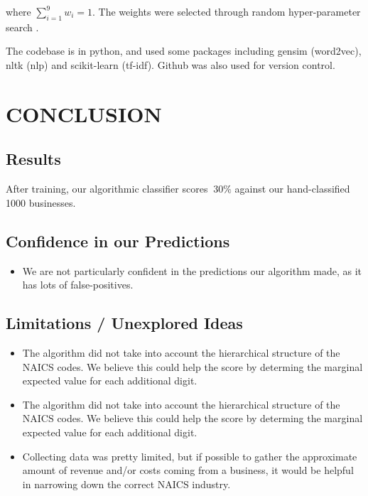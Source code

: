 \documentclass[letterpaper, 9 pt, conference]{IEEEtran}
\begin{document}
where $\sum_{i=1}^9 w_i=1$. The weights were selected through random hyper-parameter search \cite{random}.

The codebase is in python, and used some packages including gensim (word2vec), nltk (nlp) and scikit-learn (tf-idf). Github was also used for version control.

\section{CONCLUSION}

\subsection{Results}

After training, our algorithmic classifier scores $~30\%$ against our hand-classified 1000 businesses.

\subsection{Confidence in our Predictions}

\begin{itemize}
\item We are not particularly confident in the predictions our algorithm made, as it has lots of false-positives.
\end{itemize}


\subsection{Limitations / Unexplored Ideas}
\begin{itemize}
\item The algorithm did not take into account the hierarchical structure of the NAICS codes. We believe this could help the score by determing the marginal expected value for each additional digit.
\item The algorithm did not take into account the hierarchical structure of the NAICS codes. We believe this could help the score by determing the marginal expected value for each additional digit.
\item Collecting data was pretty limited, but if possible to gather the approximate amount of revenue and/or costs coming from a business, it would be helpful in narrowing down the correct NAICS industry.
\end{itemize}
\end{document}
